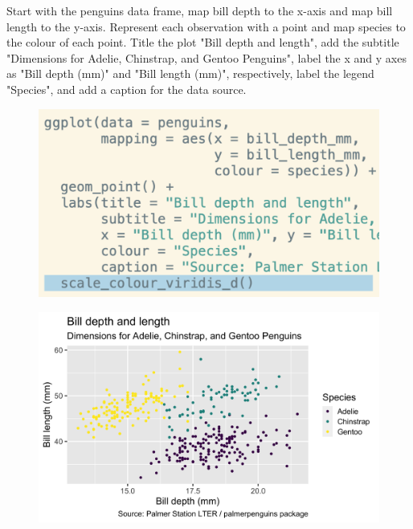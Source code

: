 \documentclass[11pt]{beamer}
\begin{document}
	\begin{frame}
	
	\small{Start with the penguins data frame, map bill depth to the x-axis and map bill length to the y-axis. Represent each observation with a point and map species to the colour of each point. Title the plot "Bill depth and length", add the subtitle "Dimensions for Adelie, Chinstrap, and Gentoo Penguins", label the x and y axes as "Bill depth (mm)" and "Bill length (mm)", respectively, label the legend "Species", and add a caption for the data source. }
	\vspace{-1.5em}
	
	\begin{minipage}[t]{0.5\linewidth}
		\begin{figure}
			\centering
			\includegraphics[width=1\linewidth]{Images/S2/code/s16}
			
		\end{figure}
	\end{minipage}%
	\begin{minipage}[t]{0.5\linewidth}
		
		\begin{figure}
			\centering
			\includegraphics[width=1\linewidth]{Images/S2/penguins-10-1}
			
		\end{figure}
		
		
	\end{minipage}
	
\end{frame}
\end{document}
